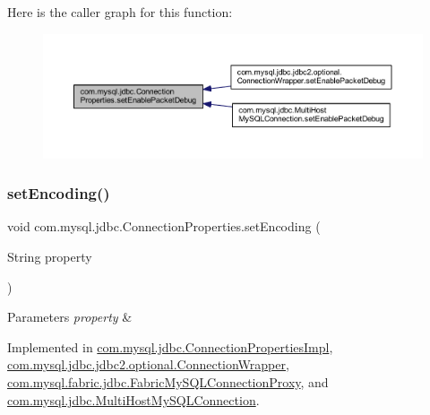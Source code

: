 Here is the caller graph for this function\+:\nopagebreak
\begin{figure}[H]
\begin{center}
\leavevmode
\includegraphics[width=350pt]{interfacecom_1_1mysql_1_1jdbc_1_1_connection_properties_a544989b319bc9a8c941c8c969011fcb5_icgraph}
\end{center}
\end{figure}
\mbox{\label{interfacecom_1_1mysql_1_1jdbc_1_1_connection_properties_a8d675a0b52e236df15eec3c77dfd8089}} 
\subsubsection{\texorpdfstring{set\+Encoding()}{setEncoding()}}
{\footnotesize\ttfamily void com.\+mysql.\+jdbc.\+Connection\+Properties.\+set\+Encoding (\begin{DoxyParamCaption}\item[{String}]{property }\end{DoxyParamCaption})}


\begin{DoxyParams}{Parameters}
{\em property} & \\
\hline
\end{DoxyParams}


Implemented in \mbox{\hyperlink{classcom_1_1mysql_1_1jdbc_1_1_connection_properties_impl_a5f45b9839aa3927e82911163c4c5fb03}{com.\+mysql.\+jdbc.\+Connection\+Properties\+Impl}}, \mbox{\hyperlink{classcom_1_1mysql_1_1jdbc_1_1jdbc2_1_1optional_1_1_connection_wrapper_ab8560df5f3d4e0152cd9181509c1e1ae}{com.\+mysql.\+jdbc.\+jdbc2.\+optional.\+Connection\+Wrapper}}, \mbox{\hyperlink{classcom_1_1mysql_1_1fabric_1_1jdbc_1_1_fabric_my_s_q_l_connection_proxy_a1b0c610feb458b4de041599d7eb87ec5}{com.\+mysql.\+fabric.\+jdbc.\+Fabric\+My\+S\+Q\+L\+Connection\+Proxy}}, and \mbox{\hyperlink{classcom_1_1mysql_1_1jdbc_1_1_multi_host_my_s_q_l_connection_ac1a500dcfbd93a1256da1104c58cfc7f}{com.\+mysql.\+jdbc.\+Multi\+Host\+My\+S\+Q\+L\+Connection}}.

